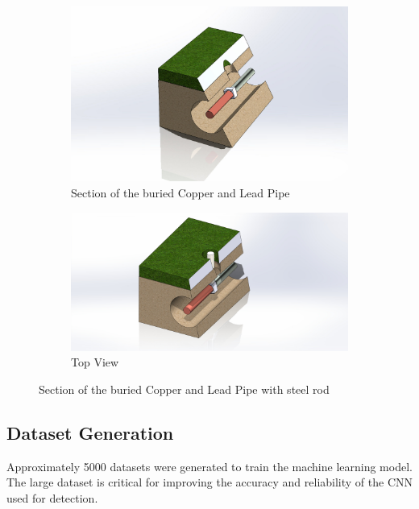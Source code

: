 \begin{figure}[t]
    \centering
    \begin{subfigure}[b]{0.4\textwidth}
        \centering
        \includegraphics[width=\textwidth]{./Section_2.png}
        \caption{Section of the buried Copper and Lead Pipe}
        \label{fig:sub1}
    \end{subfigure}
    \hfill
    \begin{subfigure}[b]{0.4\textwidth}
        \centering

        \includegraphics[width=\textwidth]{./Complete.jpg}
        \caption{Top View}
        \label{fig:sub2}
    \end{subfigure}
    \caption{Section of the buried Copper and Lead Pipe with steel rod}
    \label{fig:main}
\end{figure}



\subsection{Dataset Generation}
Approximately 5000 datasets were generated to train the machine learning model. The large dataset is critical for improving the accuracy and reliability of the CNN used for detection.

